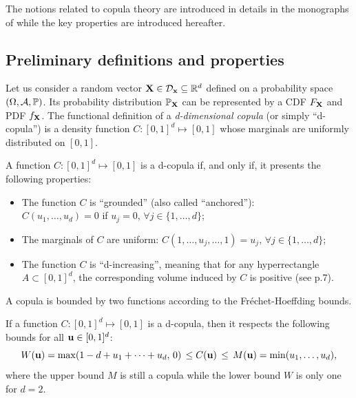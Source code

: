 The notions related to copula theory are introduced in details in the monographs of \citet{nelsen_2006_copulas,joe_2014,durante_2015_copula} while the key properties are introduced hereafter.


\subsection{Preliminary definitions and properties}\label{sec:copula_prelims}

Let us consider a random vector ${\bf X} \in \mathcal{D}_{{\bf x}}\subseteq\mathbb{R}^d$ defined on a probability space $(\Omega, \mathcal{A}, \mathbb{P})$. 
Its probability distribution $\mathbb{P}_{\bf X}$ can be represented by a CDF $F_{\bf X}$ and PDF $f_{\bf X}$. 
The functional definition of a \textit{d-dimensional copula} (or simply ``d-copula'') is a density function $C:[0, 1]^d \mapsto [0, 1]$ whose marginals are uniformly distributed on $[0, 1]$.
\begin{definition}[Copula]
    A function $C:[0, 1]^d \mapsto [0, 1]$ is a d-copula if, and only if, it presents the following properties:
    \begin{itemize}
        \item The function $C$ is ``grounded'' (also called ``anchored''): \\$C(u_1, \dots, u_d) = 0$ if $u_j=0, \, \forall j\in\{1, \dots, d\}$;
        \item The marginals of $C$ are uniform: $C(1, \dots, u_j, \dots, 1) = u_j,  \, \forall j\in\{1, \dots, d\}$;
        \item The function $C$ is ``d-increasing'', meaning that for any hyperrectangle $A \subset [0, 1]^d$, the corresponding volume induced by $C$ is positive (see \cite{durante_2015_copula} p.7). 
    \end{itemize}
\end{definition}

A copula is bounded by two functions according to the Fréchet-Hoeffding bounds. 
\begin{theorem}
    If a function $C:[0, 1]^d \mapsto [0, 1]$ is a d-copula, then it respects the following bounds for all ${\bf u} \in [0, 1]^d$: 
    \begin{equation}
        W({\bf u}) = \max (1 - d + u_1 + \dots + u_d, \, 0) \, \leq C({\bf u}) \, \leq \, M({\bf u}) = \min(u_1,\dots ,u_d),
    \end{equation} 
    where the upper bound $M$ is still a copula while the lower bound $W$ is only one for $d=2$.
\end{theorem}

